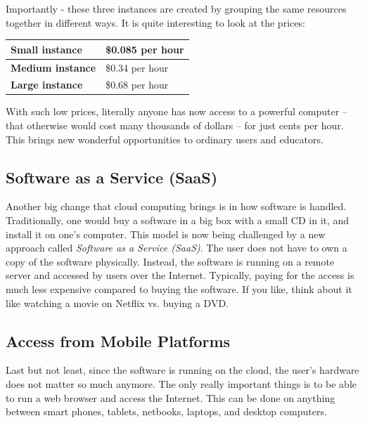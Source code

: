 \documentclass{article}
\begin{document}
\vspace{4mm}
\noindent
Importantly - these three instances are created by grouping the same resources together 
in different ways. 
It is quite interesting to look at the prices:

\begin{center}
\begin{tabular}{|l|l|}
\hline
{\bf Small instance} &	\$0.085 per hour\\
\hline
{\bf Medium instance}&	\$0.34 per hour	\\
\hline
{\bf Large instance}&	\$0.68 per hour\\
\hline
\end{tabular}
\end{center}

\vspace{4mm}
\noindent
With such low prices, literally anyone has now access to 
a powerful computer -- that otherwise would cost many thousands of dollars -- 
for just cents per hour. This brings new wonderful opportunities to ordinary users
and educators.

\subsection{Software as a Service (SaaS)}

Another big change that cloud computing brings is in how software is handled. 
Traditionally, one would buy a software in a big box with a small CD in it, 
and install it on one's computer. This model is now being challenged by a new 
approach called {\em Software as a Service (SaaS)}. The user does not have 
to own a copy of the software physically. Instead, the software is running 
on a remote server and accessed by users over the Internet. Typically, paying 
for the access is much less expensive compared to buying the software. If you like,
think about it like watching a movie on Netflix vs. buying a DVD. 

\subsection{Access from Mobile Platforms}

Last but not least, since the software is running on the cloud, the user's hardware 
does not matter so much anymore. The only really important things is to be able to 
run a web browser and access the Internet. This can be done on anything between smart 
phones, tablets, netbooks, laptops, and desktop computers. 
\end{document}
